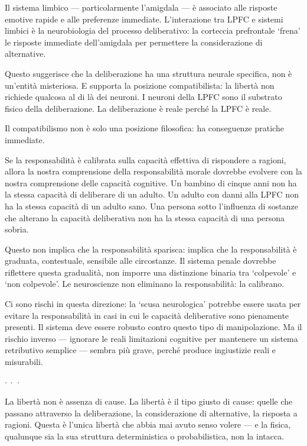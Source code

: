 \documentclass[12pt,a4paper,openany]{book}
\newcommand{\sezione}[1]{\vspace{1.2em}{\large\bfseries #1}\vspace{0.5em}\par}
\newcommand{\puntini}{\begin{center}$\cdot\ \cdot\ \cdot$\end{center}\vspace{0.3em}}
\begin{document}
Il sistema limbico --- particolarmente l'amigdala --- è associato alle risposte emotive rapide e alle preferenze immediate. L'interazione tra LPFC e sistemi limbici è la neurobiologia del processo deliberativo: la corteccia prefrontale `frena' le risposte immediate dell'amigdala per permettere la considerazione di alternative.

Questo suggerisce che la deliberazione ha una struttura neurale specifica, non è un'entità misteriosa. E supporta la posizione compatibilista: la libertà non richiede qualcosa al di là dei neuroni. I neuroni della LPFC sono il substrato fisico della deliberazione. La deliberazione è reale perché la LPFC è reale.

\sezione{Il compatibilismo e la responsabilità pratica}

Il compatibilismo non è solo una posizione filosofica: ha conseguenze pratiche immediate.

Se la responsabilità è calibrata sulla capacità effettiva di rispondere a ragioni, allora la nostra comprensione della responsabilità morale dovrebbe evolvere con la nostra comprensione delle capacità cognitive. Un bambino di cinque anni non ha la stessa capacità di deliberare di un adulto. Un adulto con danni alla LPFC non ha la stessa capacità di un adulto sano. Una persona sotto l'influenza di sostanze che alterano la capacità deliberativa non ha la stessa capacità di una persona sobria.

Questo non implica che la responsabilità sparisca: implica che la responsabilità è graduata, contestuale, sensibile alle circostanze. Il sistema penale dovrebbe riflettere questa gradualità, non imporre una distinzione binaria tra `colpevole' e `non colpevole'. Le neuroscienze non eliminano la responsabilità: la calibrano.

Ci sono rischi in questa direzione: la `scusa neurologica' potrebbe essere usata per evitare la responsabilità in casi in cui le capacità deliberative sono pienamente presenti. Il sistema deve essere robusto contro questo tipo di manipolazione. Ma il rischio inverso --- ignorare le reali limitazioni cognitive per mantenere un sistema retributivo semplice --- sembra più grave, perché produce ingiustizie reali e misurabili.

\puntini

La libertà non è assenza di cause. La libertà è il tipo giusto di cause: quelle che passano attraverso la deliberazione, la considerazione di alternative, la risposta a ragioni. Questa è l'unica libertà che abbia mai avuto senso volere --- e la fisica, qualunque sia la sua struttura deterministica o probabilistica, non la intacca.
\end{document}
